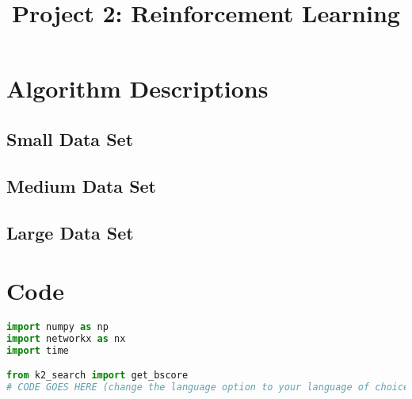 \documentclass[twoside,11pt]{article}
\begin{document}
\title{Project 2: Reinforcement Learning}



\maketitle


\section{Algorithm Descriptions}
\subsection{Small Data Set}
\lipsum[2] %

\subsection{Medium Data Set}
\lipsum[2] %

\subsection{Large Data Set}
\lipsum[2] %



\section{Code}

\begin{algorithm}
\begin{lstlisting}[language=Python]
import numpy as np
import networkx as nx
import time

from k2_search import get_bscore
# CODE GOES HERE (change the language option to your language of choice)
\end{lstlisting}
\end{algorithm}
\end{document}
